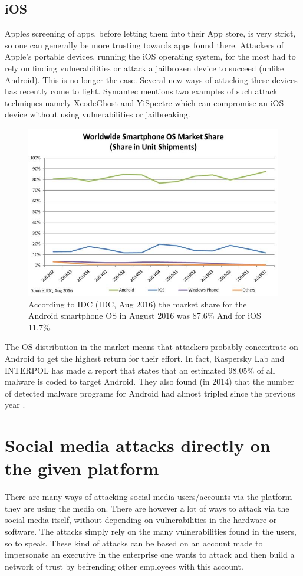\subsection{iOS}
Apples screening of apps, before letting them into their App store, is very strict, so one can generally be more trusting towards apps found there. Attackers of Apple’s portable devices, running the iOS operating system, for the most had to rely on finding vulnerabilities or attack a jailbroken device to succeed (unlike Android). This is no longer the case. Several new ways of attacking these devices has recently come to light. Symantec mentions two examples of such attack techniques namely XcodeGhost and YiSpectre which can compromise an iOS device without using vulnerabilities or jailbreaking.
\begin{figure}
\centering
\includegraphics[width=0.8 \textwidth]{fig/smartphone_market_share}
\caption{According to IDC (IDC, Aug 2016) the market share for the Android smartphone OS in August 2016 was 87.6\% And for iOS 11.7\%.\label{fig:smartphone_market_share}}
\end{figure}
The OS distribution in the market means that attackers probably concentrate on Android to get the highest return for their effort. In fact, Kaspersky Lab and INTERPOL has made a report that states that an estimated 98.05\% of all malware is coded to target Android. They also found (in 2014) that the number of detected malware programs for Android had almost tripled since the previous year \cite{Kaspersky2014}. 
\section{Social media attacks directly on the given platform}
There are many ways of attacking social media users/accounts via the platform they are using the media on. There are however a lot of ways to attack via the social media itself, without depending on vulnerabilities in the hardware or software. The attacks simply rely on the many vulnerabilities found in the users, so to speak. These kind of attacks can be based on an account made to impersonate an executive in the enterprise one wants to attack and then build a network of trust by befrending other employees with this account.
